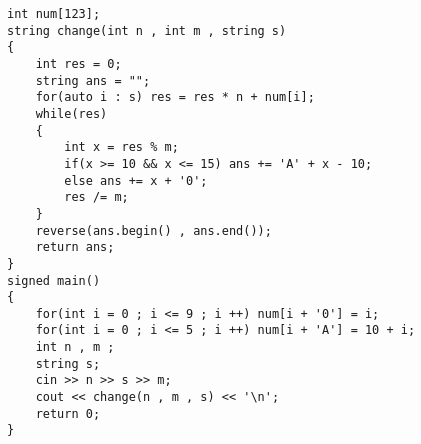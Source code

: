 \documentclass[E:/GsjzTle/main/main.tex]{subfiles}
\begin{document}
\begin{lstlisting}
int num[123];
string change(int n , int m , string s)
{
	int res = 0;
	string ans = "";
	for(auto i : s) res = res * n + num[i];
	while(res)
	{
		int x = res % m;
		if(x >= 10 && x <= 15) ans += 'A' + x - 10; 
		else ans += x + '0';
		res /= m;
	}
	reverse(ans.begin() , ans.end());
	return ans;
}
signed main()
{
	for(int i = 0 ; i <= 9 ; i ++) num[i + '0'] = i;
	for(int i = 0 ; i <= 5 ; i ++) num[i + 'A'] = 10 + i; 
	int n , m ;
	string s;
	cin >> n >> s >> m;
	cout << change(n , m , s) << '\n';
	return 0;
}
\end{lstlisting}
\end{document}
